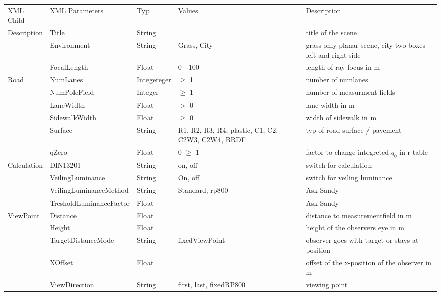 \documentclass[10pt,a4paper]{report}
\newcommand{\mytoprule}{\specialrule{0.2em}{0em}{0em}}
\newcommand{\mymidrule}{\specialrule{0.1em}{0em}{0em}}
\begin{document}
\begin{landscape}
\pagestyle{empty}
\renewcommand{\arraystretch}{1.5}
	\begin{longtable}{lllp{4cm}p{6cm}}
	\mytoprule
	\rowcolor{dunkelgrau}
		XML  Child & XML Parameters & Typ & Values & Description \\
	\mymidrule
		Description & Title & String & & title of the scene \\
	 	& Environment & String & Grass, City & grass only planar scene, city two boxes left and right side \\
	 	& FocalLength & Float & 0 - 100 & length of ray focus in m \\
	\mymidrule
	\rowcolor{hellgrau}
		Road & NumLanes & Integereger & $\geq$ 1 & number of  numlanes \\\rowcolor{hellgrau}
		 & NumPoleField & Integer & $\geq$ 1 & number of measurment fields \\\rowcolor{hellgrau}
		 & LaneWidth & Float & $>$ 0 & lane width in m \\\rowcolor{hellgrau}
		 & SidewalkWidth & Float & $\geq$ 0 & width of sidewalk in m \\\rowcolor{hellgrau}
		 & Surface & String & R1, R2, R3, R4, plastic, C1, C2, C2W3, C2W4, BRDF & typ of road surface / pavement \\\rowcolor{hellgrau}
	 & qZero & Float & 0 $\geq$ 1 & factor to change integreted $q_0$ in r-table \\
	\mymidrule
		Calculation & DIN13201 & String & on, off & switch for calculation  \\
		 & VeilingLuminance & String & On, off & switch for veiling luminance \\
		 & VeilingLuminanceMethod & String & Standard, rp800 & Ask Sandy \\
		 & TresholdLuminanceFactor & Float & & Ask Sandy \\
	\mymidrule
	\rowcolor{hellgrau}
		ViewPoint & Distance & Float & & distance to measurementfield in m \\\rowcolor{hellgrau}
		 & Height & Float & & height of the observers eye in m \\\rowcolor{hellgrau}
		 & TargetDistanceMode & String & fixedViewPoint & observer goes with target or stays at position \\\rowcolor{hellgrau}
		 & XOffset & Float & & offset of the x-position of the observer in m \\\rowcolor{hellgrau}
		 & ViewDirection & String & first, last, fixedRP800 & viewing point \\

\end{longtable}
\end{landscape}
\end{document}
